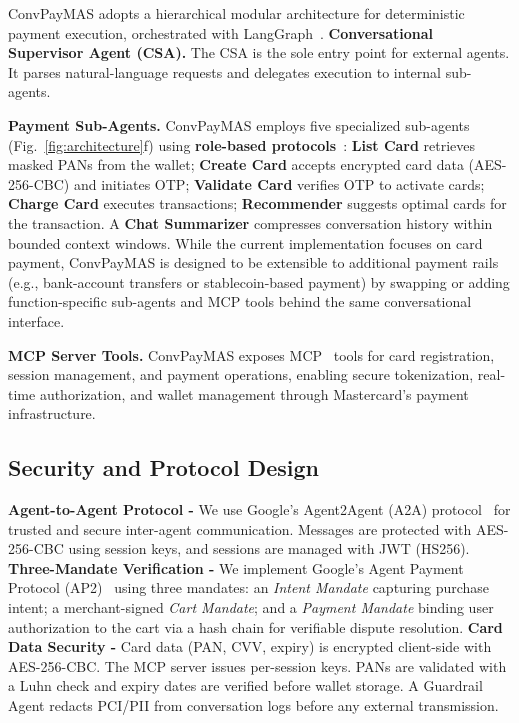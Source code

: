 \documentclass[sigconf]{aamas}
\begin{document}
ConvPayMAS adopts a hierarchical modular architecture for deterministic payment execution, orchestrated with LangGraph~\cite{langchain2024langgraph}.
\textbf{Conversational Supervisor Agent (CSA).}
The CSA is the sole entry point for external agents. It parses natural-language requests and delegates execution to internal sub-agents.

\textbf{Payment Sub-Agents.}
ConvPayMAS employs five specialized sub-agents (Fig.~\ref{fig:architecture}f) using \textbf{role-based protocols}~\cite{hong2024metagpt, tran2025mascollab, guo2024mascollab}:
\textbf{List Card} retrieves masked PANs from the wallet;
\textbf{Create Card} accepts encrypted card data (AES-256-CBC) and initiates OTP;
\textbf{Validate Card} verifies OTP to activate cards;
\textbf{Charge Card} executes transactions;
\textbf{Recommender} suggests optimal cards for the transaction.
A \textbf{Chat Summarizer} compresses conversation history within bounded context windows.
While the current implementation focuses on card payment, ConvPayMAS is designed to be extensible to additional payment rails (e.g., bank-account transfers or stablecoin-based payment) by swapping or adding function-specific sub-agents and MCP tools behind the same conversational interface.

\textbf{MCP Server Tools.}
ConvPayMAS exposes MCP~\cite{anthropic2024mcp} tools for card registration, session management, and payment operations, enabling secure tokenization, real-time authorization, and wallet management through Mastercard's payment infrastructure.

\subsection{Security and Protocol Design}

\textbf{Agent-to-Agent Protocol -}
We use Google’s Agent2Agent (A2A) protocol~\cite{google2025a2a} for trusted and secure inter-agent communication. Messages are protected with AES-256-CBC using session keys, and sessions are managed with JWT (HS256). \textbf{Three-Mandate Verification -} We implement Google’s Agent Payment Protocol (AP2)~\cite{google2025ap2} using three mandates: an \textit{Intent Mandate} capturing purchase intent; a merchant-signed \textit{Cart Mandate}; and a \textit{Payment Mandate} binding user authorization to the cart via a hash chain for verifiable dispute resolution. \textbf{Card Data Security -} Card data (PAN, CVV, expiry) is encrypted client-side with AES-256-CBC. The MCP server issues per-session keys. PANs are validated with a Luhn check and expiry dates are verified before wallet storage. A Guardrail Agent redacts PCI/PII from conversation logs before any external transmission.
\end{document}
